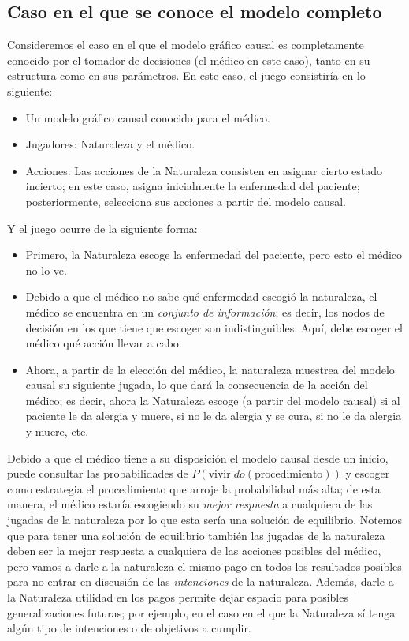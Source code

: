 \documentclass[11pt]{article}
\theoremstyle{plain}
\begin{document}
\subsection{Caso en el que se conoce el modelo completo}
Consideremos el caso en el que el modelo gráfico causal es completamente conocido por el tomador de decisiones (el médico en este caso), tanto en su estructura como en sus parámetros. En este caso, el juego consistiría en lo siguiente:\\
\begin{itemize}
\item Un modelo gráfico causal conocido para el médico.
\item Jugadores: Naturaleza y el médico.
\item Acciones: Las acciones de la Naturaleza consisten en asignar cierto estado incierto; en este caso, asigna inicialmente la enfermedad del paciente; posteriormente, selecciona sus acciones a partir del modelo causal.
\end{itemize}
Y el juego ocurre de la siguiente forma:
\begin{itemize}
\item Primero, la Naturaleza escoge la enfermedad del paciente, pero esto el médico no lo ve.
\item Debido a que el médico no sabe qué enfermedad escogió la naturaleza, el médico se encuentra en un \textit{conjunto de información}; es decir, los nodos de decisión en los que tiene que escoger son indistinguibles. Aquí, debe escoger el médico qué acción llevar a cabo. 
\item Ahora, a partir de la elección del médico, la naturaleza muestrea del modelo causal su siguiente jugada, lo que dará la consecuencia de la acción del médico; es decir, ahora la Naturaleza escoge (a partir del modelo causal) si al paciente le da alergia y muere, si no le da alergia y se cura, si no le da alergia y muere, etc.
\end{itemize}
Debido a que el médico tiene a su disposición el modelo causal desde un inicio, puede consultar las probabilidades de $P( \textrm{vivir} | do(\textrm{procedimiento}))$ y escoger como estrategia el procedimiento que arroje la probabilidad más alta; de esta manera, el médico estaría escogiendo su \textit{mejor respuesta} a cualquiera de las jugadas de la naturaleza por lo que esta sería una solución de equilibrio. Notemos que para tener una solución de equilibrio también las jugadas de la naturaleza deben ser la mejor respuesta a cualquiera de las acciones posibles del médico,  pero vamos a darle a la naturaleza el mismo pago en todos los resultados posibles para no entrar en discusión de las \textit{intenciones} de la naturaleza. Además, darle a la Naturaleza utilidad en los pagos permite dejar espacio para posibles generalizaciones futuras; por ejemplo, en el caso en el que la Naturaleza sí tenga algún tipo de intenciones o de objetivos a cumplir.\\
\end{document}
